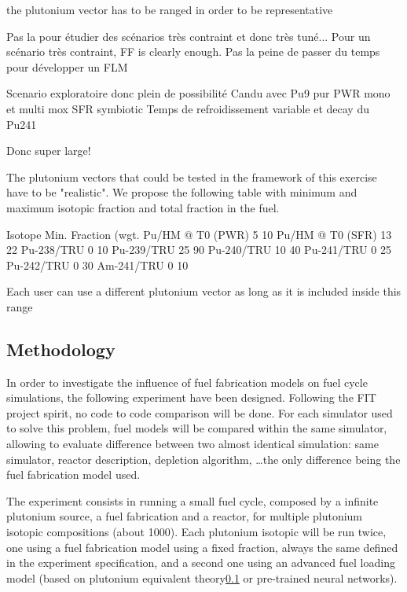 the plutonium vector has to be ranged in order to be representative 

Pas la pour étudier des scénarios très contraint et donc très tuné... Pour un scénario très contraint, FF is clearly enough. Pas la peine de passer du temps pour développer un FLM

Scenario exploratoire donc plein de possibilité
Candu avec Pu9 pur
PWR mono et multi mox
SFR symbiotic 
Temps de refroidissement variable et decay du Pu241

Donc super large!


The plutonium vectors that could be tested in the framework of this exercise have to be "realistic". We propose the following table with minimum and maximum isotopic fraction and total fraction in the fuel. 

Isotope Min. Fraction (wgt. %
Pu/HM @ T0 (PWR)    5   10
Pu/HM @ T0 (SFR)    13  22
Pu-238/TRU  0   10
Pu-239/TRU  25  90
Pu-240/TRU  10  40
Pu-241/TRU  0   25
Pu-242/TRU  0   30
Am-241/TRU  0   10

Each user can use a different plutonium vector as long as it is included inside this range


\subsection{Methodology}

In order to investigate the influence of fuel fabrication models on fuel cycle
simulations, the following experiment have been designed. Following the FIT
project spirit, no code to code comparison will be done. For each simulator used
to solve this problem, fuel models will be compared within the same simulator,
allowing to evaluate difference between two almost identical simulation: same
simulator, reactor description, depletion algorithm, \ldots the only difference
being the fuel fabrication model used.

The experiment consists in running a small fuel cycle, composed by a infinite
plutonium source, a fuel fabrication and a reactor, for multiple plutonium
isotopic compositions (about 1000). Each plutonium isotopic will be run twice,
one using a fuel fabrication model using a fixed fraction, always the same
defined in the experiment specification, and a second one using an advanced fuel
loading model (based on plutonium equivalent theory\ref{} or pre-trained neural
networks).

